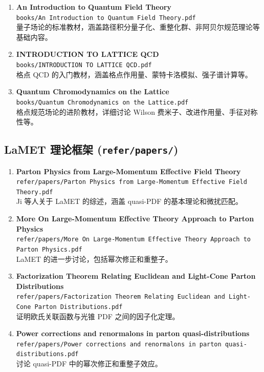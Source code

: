 \documentclass[12pt,a4paper]{ctexart}
\begin{document}
\begin{enumerate}
    \item \textbf{An Introduction to Quantum Field Theory} \\
    \texttt{books/An Introduction to Quantum Field Theory.pdf} \\
    量子场论的标准教材，涵盖路径积分量子化、重整化群、非阿贝尔规范理论等基础内容。

    \item \textbf{INTRODUCTION TO LATTICE QCD} \\
    \texttt{books/INTRODUCTION TO LATTICE QCD.pdf} \\
    格点 QCD 的入门教材，涵盖格点作用量、蒙特卡洛模拟、强子谱计算等。

    \item \textbf{Quantum Chromodynamics on the Lattice} \\
    \texttt{books/Quantum Chromodynamics on the Lattice.pdf} \\
    格点规范场论的进阶教材，详细讨论 Wilson 费米子、改进作用量、手征对称性等。
\end{enumerate}

\subsection{LaMET 理论框架 (\texttt{refer/papers/})}

\begin{enumerate}
    \item \textbf{Parton Physics from Large-Momentum Effective Field Theory} \\
    \texttt{refer/papers/Parton Physics from Large-Momentum Effective Field Theory.pdf} \\
    Ji 等人关于 LaMET 的综述，涵盖 quasi-PDF 的基本理论和微扰匹配。

    \item \textbf{More On Large-Momentum Effective Theory Approach to Parton Physics} \\
    \texttt{refer/papers/More On Large-Momentum Effective Theory Approach to Parton Physics.pdf} \\
    LaMET 的进一步讨论，包括幂次修正和重整子。

    \item \textbf{Factorization Theorem Relating Euclidean and Light-Cone Parton Distributions} \\
    \texttt{refer/papers/Factorization Theorem Relating Euclidean and Light-Cone Parton Distributions.pdf} \\
    证明欧氏关联函数与光锥 PDF 之间的因子化定理。

    \item \textbf{Power corrections and renormalons in parton quasi-distributions} \\
    \texttt{refer/papers/Power corrections and renormalons in parton quasi-distributions.pdf} \\
    讨论 quasi-PDF 中的幂次修正和重整子效应。
\end{enumerate}
\end{document}
